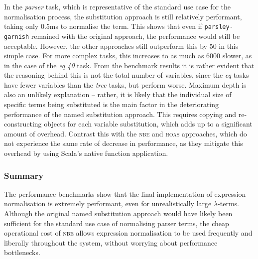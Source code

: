 \documentclass[../../main.tex]{subfiles}
\begin{document}
In the \emph{parser} task, which is representative of the standard use case for the normalisation process, the substitution approach is still relatively performant, taking only 0.5ms to normalise the term.
This shows that even if \texttt{parsley-garnish} remained with the original approach, the performance would still be acceptable.
However, the other approaches still outperform this by 50\raisebox{-0.6pt}{$\times$} in this simple case.
For more complex tasks, this increases to as much as 6000\raisebox{-0.6pt}{$\times$} slower, as in the case of the \emph{eq 40} task.
From the benchmark results it is rather evident that the reasoning behind this is not the total number of variables, since the \emph{eq} tasks have fewer variables than the \emph{tree} tasks, but perform worse.
Maximum depth is also an unlikely explanation -- rather, it is likely that the individual size of specific terms being substituted is the main factor in the deteriorating performance of the named substitution approach.
This requires copying and re-constructing objects for each variable substitution, which adds up to a significant amount of overhead.
Contrast this with the \textsc{nbe} and \textsc{hoas} approaches, which do not experience the same rate of decrease in performance, as they mitigate this overhead by using Scala's native function application.

\subsubsection*{Summary}
The performance benchmarks show that the final implementation of expression normalisation is extremely performant, even for unrealistically large $\lambda$-terms.
Although the original named substitution approach would have likely been sufficient for the standard use case of normalising parser terms, the cheap operational cost of \textsc{nbe} allows expression normalisation to be used frequently and liberally throughout the system, without worrying about performance bottlenecks.
\end{document}
